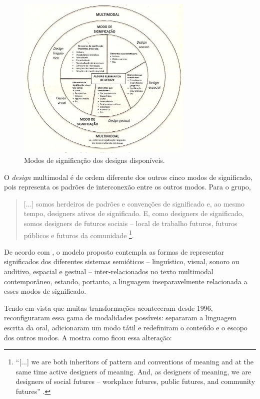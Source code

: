 \documentclass{textolivre}
\begin{document}
\begin{figure}[htbp]
 \centering
 \includegraphics[width=0.75\textwidth]{figure02.png}
 \caption{Modos de significação dos designs disponíveis.}
 \label{fig02}
\end{figure}

O \emph{design} multimodal é de ordem diferente dos outros cinco modos de
significado, pois representa os padrões de interconexão entre os outros modos.
Para o grupo,
\begin{quote}
[...] somos herdeiros de padrões e convenções de significado e, ao mesmo tempo,
designers ativos de significado. E, como designers de significado, somos
designers de futuros sociais – local de trabalho futuros, futuros públicos e
futuros da comunidade \cite[p. 65, tradução nossa]{cazden1996}\footnote{
“[...] we are both inheritors of pattern and conventions of meaning and at the
same time active designers of meaning. And, as designers of meaning, we are
designers of social futures – workplace futures, public futures, and community
futures” \cite[p. 65]{cazden1996}.
}. 
\end{quote}

De acordo com \textcite{cope2009}, o modelo proposto contempla as formas de
representar significados dos diferentes sistemas semióticos – linguístico,
visual, sonoro ou auditivo, espacial e gestual – inter-relacionados no texto
multimodal contemporâneo, estando, portanto, a linguagem inseparavelmente
relacionada a esses modos de significado.

Tendo em vista que muitas transformações aconteceram desde 1996, \textcite{cope2009}
reconfiguraram essa gama de modalidades possíveis: separaram a
linguagem escrita da oral, adicionaram um modo tátil e redefiniram o conteúdo e
o escopo dos outros modos. A  mostra como ficou essa alteração:
\end{document}

